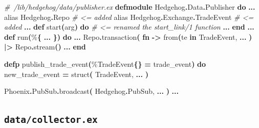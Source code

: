 \documentclass[
  oneside]{book}
\newenvironment{Shaded}{\begin{snugshade}}{\end{snugshade}}
\newcommand{\CommentTok}[1]{\textcolor[rgb]{0.56,0.35,0.01}{\textit{#1}}}
\newcommand{\ConstantTok}[1]{\textcolor[rgb]{0.56,0.35,0.01}{#1}}
\newcommand{\FunctionTok}[1]{\textcolor[rgb]{0.13,0.29,0.53}{\textbf{#1}}}
\newcommand{\ImportTok}[1]{#1}
\newcommand{\KeywordTok}[1]{\textcolor[rgb]{0.13,0.29,0.53}{\textbf{#1}}}
\newcommand{\NormalTok}[1]{#1}
\newcommand{\OperatorTok}[1]{\textcolor[rgb]{0.81,0.36,0.00}{\textbf{#1}}}
\begin{document}
\begin{Shaded}
\begin{Highlighting}[]
\CommentTok{\# /lib/hedgehog/data/publisher.ex}
\KeywordTok{defmodule} \ConstantTok{Hedgehog}\OperatorTok{.}\ConstantTok{Data}\OperatorTok{.}\ConstantTok{Publisher} \KeywordTok{do}
\OperatorTok{...}
  \ImportTok{alias} \ConstantTok{Hedgehog}\OperatorTok{.}\ConstantTok{Repo}                 \CommentTok{\# \textless{}= added}
  \ImportTok{alias} \ConstantTok{Hedgehog}\OperatorTok{.}\ConstantTok{Exchange}\OperatorTok{.}\ConstantTok{TradeEvent}  \CommentTok{\# \textless{}= added}
  \OperatorTok{...}
  \KeywordTok{def}\NormalTok{ start}\FunctionTok{(}\NormalTok{arg}\FunctionTok{)} \KeywordTok{do} \CommentTok{\# \textless{}= renamed the \textasciigrave{}start\_link/1\textasciigrave{} function }
    \OperatorTok{...}
  \KeywordTok{end}
  \OperatorTok{...}
  \KeywordTok{def}\NormalTok{ run}\FunctionTok{(}\NormalTok{\%}\FunctionTok{\{}
    \OperatorTok{...}
 \FunctionTok{\})} \KeywordTok{do}
    \OperatorTok{...}
    \ConstantTok{Repo}\OperatorTok{.}\NormalTok{transaction}\FunctionTok{(}
      \KeywordTok{fn} \OperatorTok{{-}\textgreater{}}
\NormalTok{        from}\FunctionTok{(}\NormalTok{te }\KeywordTok{in} \ConstantTok{TradeEvent}\NormalTok{,}
          \OperatorTok{...}
        \FunctionTok{)}
        \OperatorTok{|\textgreater{}} \ConstantTok{Repo}\OperatorTok{.}\NormalTok{stream}\FunctionTok{()}
    \OperatorTok{...}
  \KeywordTok{end}

  \KeywordTok{defp}\NormalTok{ publish\_trade\_event}\FunctionTok{(}\NormalTok{\%}\ConstantTok{TradeEvent}\FunctionTok{\{\}} \OperatorTok{=}\NormalTok{ trade\_event}\FunctionTok{)} \KeywordTok{do}
\NormalTok{    new\_trade\_event }\OperatorTok{=}
\NormalTok{      struct}\FunctionTok{(}
        \ConstantTok{TradeEvent}\NormalTok{,}
        \OperatorTok{...}
      \FunctionTok{)}

    \ConstantTok{Phoenix}\OperatorTok{.}\ConstantTok{PubSub}\OperatorTok{.}\NormalTok{broadcast}\FunctionTok{(}
      \ConstantTok{Hedgehog}\OperatorTok{.}\ConstantTok{PubSub}\NormalTok{,}
      \OperatorTok{...}
    \FunctionTok{)}
\OperatorTok{...}
\end{Highlighting}
\end{Shaded}

\subsection{\texorpdfstring{\texttt{data/collector.ex}}{data/collector.ex}}\label{datacollector.ex}
\end{document}
